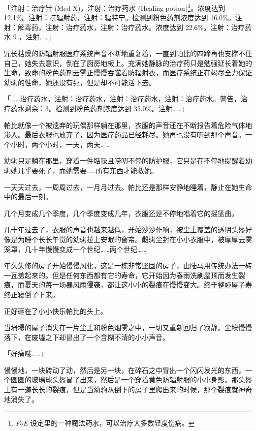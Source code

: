 「{\mt 注射：治疗针 (Med X)，注射：治疗药水 (Healing potion)\footnote{\emph{FoE} 设定里的一种魔法药水，可以治疗大多数轻度伤病。}。浓度达到 12.1\%。注射：抗辐射药，注射：辐特宁。检测到粉色药剂浓度达到 16.0\%。注射：解毒药，注射：治疗药水，注射：治疗药水。浓度达到 22.6\%。注射：治疗药水
9 ，注射……}」

冗长枯燥的防辐射服医疗系统声音不断地重复着，一直到帕比的四蹄再也支撑不住自己，她失去意识，倒在了厨房地板上。充满她静脉的治疗药只是勉强延长着她的生命，致命的粉色药剂云雾正慢慢吞噬着防辐射衣，而医疗系统正在竭尽全力保证幼驹的性命，她还没有死，但是却不可能活下去。

「{\mt ……治疗药水，注射：治疗药水，注射：治疗药水，注射：治疗药水。警告，治疗药水剩余：3。检测到粉色药剂浓度达到 35.0\%。注射……}」

帕比就像一个被遗弃的玩偶那样躺在那里，衣服的声音还在不断报告着危险气体地渗入。最后衣服也放弃了，因为医疗药品已经耗尽。她再也没有听到那个声音。一个小时，两个小时，一天，两天……

幼驹只是躺在那里，穿着一件聒噪且唠叨不停的防护服，它只是在不停地提醒着幼驹她几乎要死了，而她需要……所有东西才能救她。

一天天过去，一周周过去，一月月过去。帕比还是那样安静地睡着，静止在她生命中的最后一刻。

几个月变成几个季度，几个季度变成几年，衣服还是不停地唱着它的摇篮曲。

几十年过去了，衣服的声音也越来越低，开始沙沙作响，被尘土覆盖的透明头盔好像是为睡个长长午觉的幼驹拉上安眠的窗帘。雌驹尘封在小小衣服中，被厚厚云雾笼罩，几十年慢慢变成一个世纪……两个世纪……

年久失修的房子开始慢慢风化，这是一栋非常坚固的房子，由陆马用传统办法一砖一瓦盖起来的。但是任何东西都有它的寿命，它开始因为春雨洗刷屋顶而发生裂痕，而夏天的每一场暴风雨侵袭，都让这小小的裂痕在慢慢变大。终于整幢屋子寿终正寝倒了下来。

正好砸在了小小快乐帕比的头上。

\horizonline


当坍塌的屋子消失在一片尘土和粉色烟雾之中，一切又重新回归了寂静。尘埃慢慢落下，在废墟之下却冒出了一个含糊不清的小小声音。

「好痛哦……」

慢慢地，一块砖动了动，然后是另一块，在碎石之中冒出一个闪闪发光的东西，一个圆圆的玻璃球头盔冒了出来，然后是一个穿着黄色防辐射服的小小身影。那头盔上有一道长长的裂痕，但是当幼驹从倒下的房子里爬出来的时候，那个裂痕就神奇地消失了。

